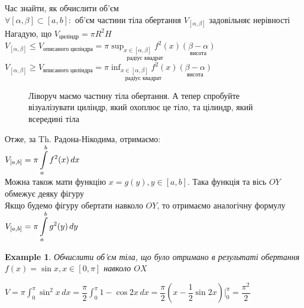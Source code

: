 \documentclass[a4paper, 14pt]{extarticle}
\def\huge{\displaystyle}
\def\bigline{\vspace{5mm}\\}
\theoremstyle{theoremdd}
\theoremstyle{theoremdd}
\theoremstyle{theoremdd}
\theoremstyle{theoremdd}
\newtheorem{example}[theorem]{Example}
\theoremstyle{theoremdd}
\theoremstyle{theoremdd}
\theoremstyle{theoremdd}
\theoremstyle{theoremdd}
\begin{document}
Час знайти, як обчислити об'єм\\
$\forall [\alpha, \beta] \subset [a,b]:$ об'єм частини тіла обертання $V_{[\alpha,\beta]}$ задовільняє нерівності\\
Нагадую, що $V_{\text{циліндр}} = \pi R^2 H$\\
$V_{[\alpha,\beta]} \leq V_{\text{описаного циліндра}} = \pi \huge \underset{\text{радіус квадрат}}{\sup_{x \in [\alpha, \beta]} f^2(x)} \underset{\text{висота}}{(\beta - \alpha)}$\\
$V_{[\alpha,\beta]} \geq V_{\text{вписаного циліндра}} = \pi \huge \underset{\text{радіус квадрат}}{\inf_{x \in [\alpha, \beta]} f^2(x)} \underset{\text{висота}}{(\beta - \alpha)}$
\begin{figure}[H]
\centering
{}
\caption*{Ліворуч маємо частину тіла обертання. А тепер спробуйте візуалізувати циліндр, який охоплює це тіло, та цілиндр, який всередині тіла}
\end{figure}

Отже, за Th. Радона-Нікодима, отримаємо:\\
$V_{[a,b]} = \huge \pi \int\displaylimits_a^b f^2(x)\,dx$
\bigline
Можна також мати функцію $x = g(y), y \in [a,b]$. Така функція та вісь $OY$ обмежує деяку фігуру\\
Якщо будемо фігуру обертати навколо $OY$, то отримаємо аналогічну формулу\\
$V_{[a,b]} = \huge \pi \int\displaylimits_a^b g^2(y)\,dy$
\bigline

\begin{example}
Обчислити об'єм тіла, що було отримано в результаті обертання $f(x) = \sin x, x \in [0,\pi]$ навколо $OX$
\begin{figure}[H]
\centering
{}
\end{figure}
$V = \pi \huge\int_0^\pi \sin^2 x \,dx = \dfrac{\pi}{2} \huge\int_0^\pi 1 - \cos 2x \,dx = \dfrac{\pi}{2} \left(x - \dfrac{1}{2} \sin 2x \right) \Big|_0^\pi = \dfrac{\pi^2}{2}$
\end{example}
\end{document}
